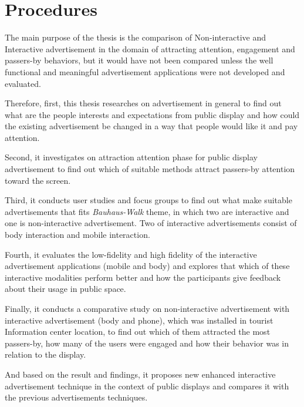 \section{Procedures}

The main purpose of the thesis is the comparison of Non-interactive and Interactive advertisement in the domain of attracting attention, engagement and passers-by behaviors, but it would have not been compared unless the well functional and meaningful advertisement applications were not developed and evaluated. 

Therefore, first, this thesis researches on advertisement in general to find out what are the people interests and expectations from public display and how could the existing advertisement be changed in a way that people would like it and pay attention.

Second, it investigates on attraction attention phase for public display advertisement to find out which of suitable methods attract passers-by attention toward the screen.

Third, it conducts user studies and focus groups to find out what make suitable advertisements that fits \emph{Bauhaus-Walk} theme, in which two are interactive and one is non-interactive advertisement. Two of interactive advertisements consist of body interaction and mobile interaction.

Fourth, it evaluates the low-fidelity and high fidelity of the interactive advertisement applications (mobile and body) and explores that which of these interactive modalities perform better and how the participants give feedback about their usage in public space.

Finally, it conducts a comparative study on non-interactive advertisement with interactive advertisement (body and phone), which was installed in tourist Information center location, to find out which of them attracted the most passers-by, how many of the users were engaged and how their behavior was in relation to the display.

And based on the result and findings, it proposes new enhanced interactive advertisement technique in the context of public displays and compares it with the previous advertisements techniques.



